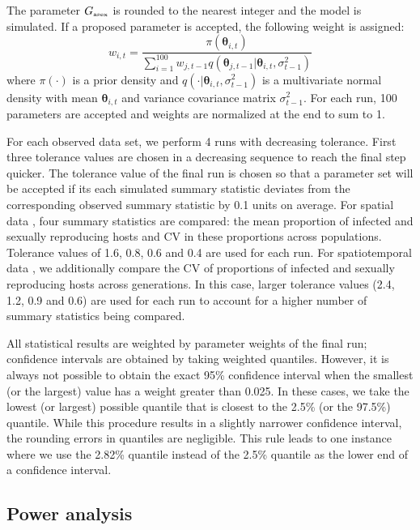 \documentclass{article}\usepackage[]{graphicx}\usepackage[]{color}
\begin{document}
The parameter $G_{\textrm{\tiny asex}}$ is rounded to the nearest integer and the model is simulated.
If a proposed parameter is accepted, the following weight is assigned:
$$
w_{i,t} = \frac{\pi(\bm\theta_{i, t})}{\sum_{i=1}^{100} w_{j, t-1} q(\bm\theta_{j, t-1} | \bm\theta_{i,t}, \sigma_{t-1}^2)}
$$
where $\pi(\cdot)$ is a prior density and $q(\cdot | \bm\theta_{i,t}, \sigma_{t-1}^2)$ is a multivariate normal density with mean $\bm\theta_{i,t}$ and variance covariance matrix $\sigma_{t-1}^2$.
For each run, 100 parameters are accepted and weights are normalized at the end to sum to 1.

For each observed data set, we perform 4 runs with decreasing tolerance.
First three tolerance values are chosen in a decreasing sequence to reach the final step quicker.
The tolerance value of the final run is chosen so that a parameter set will be accepted if its each simulated summary statistic deviates from the corresponding observed summary statistic by 0.1 units on average.
For spatial data \citep{dagan2013clonal, mckone2016fine}, four summary statistics are compared: the mean proportion of infected and sexually reproducing hosts and CV in these proportions across populations.
Tolerance values of 1.6, 0.8, 0.6 and 0.4 are used for each run.
For spatiotemporal data \citep{vergara2014infection}, we additionally compare the CV of proportions of infected and sexually reproducing hosts across generations.
In this case, larger tolerance values (2.4, 1.2, 0.9 and 0.6) are used for each run to account for a higher number of summary statistics being compared.

All statistical results are weighted by parameter weights of the final run; 
confidence intervals are obtained by taking weighted quantiles. 
However, it is always not possible to obtain the exact 95\% confidence interval when the smallest (or the largest) value has a weight greater than 0.025. 
In these cases, we take the lowest (or largest) possible quantile that is closest to the 2.5\% (or the 97.5\%) quantile.
While this procedure results in a slightly narrower confidence interval, the rounding errors in quantiles are negligible. 
This rule leads to one instance where we use the 2.82\% quantile instead of the 2.5\% quantile as the lower end of a confidence interval.

\subsection{Power analysis}
\end{document}
